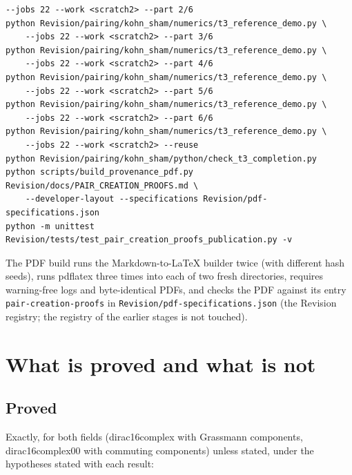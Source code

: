 \documentclass[11pt]{article}
\begin{document}
\begin{Verbatim}[fontsize=\small]
    --jobs 22 --work <scratch2> --part 2/6
python Revision/pairing/kohn_sham/numerics/t3_reference_demo.py \
    --jobs 22 --work <scratch2> --part 3/6
python Revision/pairing/kohn_sham/numerics/t3_reference_demo.py \
    --jobs 22 --work <scratch2> --part 4/6
python Revision/pairing/kohn_sham/numerics/t3_reference_demo.py \
    --jobs 22 --work <scratch2> --part 5/6
python Revision/pairing/kohn_sham/numerics/t3_reference_demo.py \
    --jobs 22 --work <scratch2> --part 6/6
python Revision/pairing/kohn_sham/numerics/t3_reference_demo.py \
    --jobs 22 --work <scratch2> --reuse
python Revision/pairing/kohn_sham/python/check_t3_completion.py
python scripts/build_provenance_pdf.py Revision/docs/PAIR_CREATION_PROOFS.md \
    --developer-layout --specifications Revision/pdf-specifications.json
python -m unittest Revision/tests/test_pair_creation_proofs_publication.py -v
\end{Verbatim}

The PDF build runs the Markdown-to-LaTeX builder twice (with different hash seeds), runs pdflatex three times into each of two fresh directories, requires warning-free logs and byte-identical PDFs, and checks the PDF against its entry \texttt{pair-cre\allowbreak{}ation-pr\allowbreak{}oofs} in \texttt{Revision\allowbreak{}/pdf-spe\allowbreak{}cificati\allowbreak{}ons.json} (the Revision registry; the registry of the earlier stages is not touched).

\section{What is proved and what is not}

\subsection{Proved}

Exactly, for both fields (dirac16complex with Grassmann components, dirac16complex00 with commuting components) unless stated, under the hypotheses stated with each result:
\end{document}
